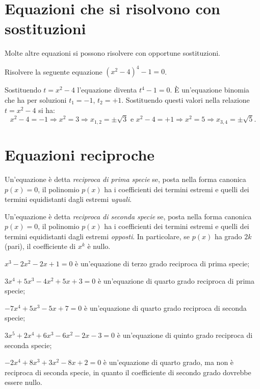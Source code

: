 \section{Equazioni che si risolvono con sostituzioni}
Molte altre equazioni si possono risolvere con opportune sostituzioni.
\begin{exrig}
\begin{esempio}
Risolvere la seguente equazione $ \left(x^2-4\right)^4-1=0 $.

Sostituendo $t=x^2-4$ l'equazione diventa $t^4-1=0$. È un'equazione binomia che ha per soluzioni $t_1=-1$, $t_2=+1$. Sostituendo questi valori nella relazione $t=x^2-4$ si ha: 
\[x^2-4=-1\Rightarrow x^2=3\Rightarrow x_{1,2}=\pm \sqrt 3\text{ e }x^2-4=+1\Rightarrow x^2=5\Rightarrow x_{3,4}=\pm \sqrt 5.\]
\end{esempio}
\end{exrig}
\ovalbox{\risolvii \ref{ese:5.34},\ref{ese:5.35},\ref{ese:5.36}, \ref{ese:5.37}}

\section{Equazioni reciproche}
\begin{definizione}
Un’equazione è detta \emph{reciproca di prima specie} se, posta nella forma canonica $p(x)=0$, il polinomio $p(x)$ ha i coefficienti dei termini estremi e quelli dei termini equidistanti dagli estremi \emph{uguali}.

Un’equazione è detta \emph{reciproca di seconda specie} se, posta nella forma canonica $p(x)=0$, il polinomio $p(x)$ ha i coefficienti dei termini estremi e quelli dei termini equidistanti dagli estremi \emph{opposti}. In particolare, se $p(x)$ ha grado $2k$ (pari), il coefficiente di $x^k$ è nullo.
\end{definizione}

\begin{itemize*}
\item $x^3-2x^2-2x+1=0$ è un’equazione di terzo grado reciproca di prima specie;
\item $3x^4+5x^3-4x^2+5x+3=0$ è un’equazione di quarto grado reciproca di prima specie;
\item $-7x^4+5x^3-5x+7=0$ è un’equazione di quarto grado reciproca di seconda specie;
\item $3x^5+2x^4+6x^3-6x^2-2x-3=0$ è un’equazione di quinto grado reciproca di seconda specie;
\item $-2x^4+8x^3+3x^2-8x+2=0$ è un’equazione di quarto grado, ma non è reciproca di seconda specie, in quanto il coefficiente di secondo grado dovrebbe essere nullo.
\end{itemize*}

